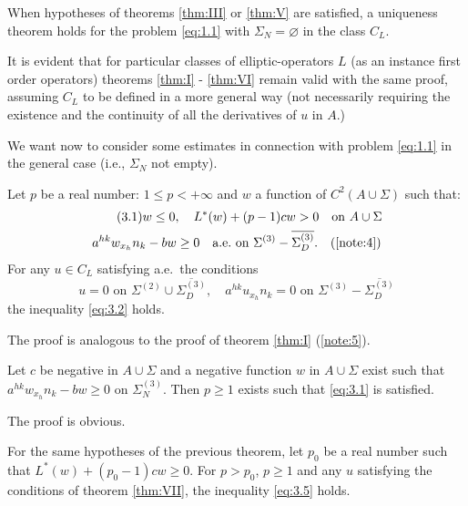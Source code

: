 \documentclass[a4paper,12pt,leqno]{article}
\numberwithin{equation}{section}
\newenvironment{thm}[1]
{\renewcommand\theinnerproblem{#1}\innerproblem}
{\endinnerproblem}
\begin{document}
\begin{thm}{VI} \label{thm:VI}
	When hypotheses of theorems \ref{thm:III} or \ref{thm:V} are satisfied, a uniqueness theorem holds for the problem \eqref{eq:1.1} with ${\Sigma}_N=\varnothing$ in the class
	$C_{L}$.
\end{thm}

It is evident that for particular classes of elliptic-operators $L$ (as an instance first order operators) theorems \ref{thm:I} - \ref{thm:VI} remain valid with the same proof, assuming $C_{L}$ to be defined in a more general way (not 	necessarily requiring the existence and the continuity of all the derivatives of $u$ in $A$.)

We want now to consider some estimates in connection with problem \eqref{eq:1.1} in the general case (i.e., $\Sigma_N$ not empty).

\begin{thm}{VII} \label{thm:VII}
	Let $p$ be a real number: $1 \leq p<+\infty$ and $w$ a function of $C^{2}(A \cup \Sigma)$ such that:
	\begin{gather}
		\tag{3.1}
		w \leq 0, \quad L^{*}(w)+(p-1) c w>0
		\quad \text{on } A \cup \Sigma \\
		\nonumber
		a^{h k} w_{x_{h}}n_{k}-b w \geq 0 \quad \text{a.e.\ on } \Sigma^{(3)}-\overline{\Sigma^{(3)}_D}. \quad (\ref{note:4})
	\end{gather}
	For any $u \in C_{L}$ satisfying a.e.\ the conditions
	\begin{equation*}
		u = 0 \text{ on } \Sigma^{(2)} \cup \overline{\Sigma^{(3)}_D}, \quad 
		a^{hk} u_{x_h} n_k = 0 \text{ on } \Sigma^{(3)}-\overline{\Sigma^{(3)}_D}
	\end{equation*}
	the inequality \eqref{eq:3.2} holds.
\end{thm}

The proof is analogous to the proof of theorem \ref{thm:I} (\ref{note:5}).

\begin{thm}{VIII} \label{thm:VIII}
	Let $c$ be negative in $A \cup \Sigma$ and a negative function $w$ in $A\cup\Sigma$ exist such that $a^{hk} w_{x_h}n_k-bw\geq 0$ on $\Sigma_N^{(3)}$. 
	Then $p\geq 1$ exists such that \eqref{eq:3.1} is satisfied.
\end{thm}

The proof is obvious.

\begin{thm}{IX} \label{thm:IX}
	For the same hypotheses of the previous theorem, let $p_{0}$ be a real number such that $L^{*}(w)+\left(p_{0}-1\right) c w \geq 0$.
	For $p>p_{0}$, $p \geq 1$ and any $u$ satisfying the conditions of theorem \ref{thm:VII}, the inequality \eqref{eq:3.5} holds.
\end{thm}
\end{document}
